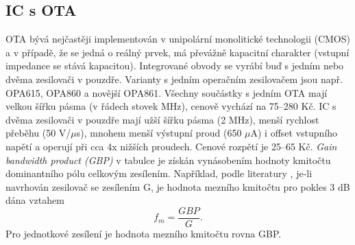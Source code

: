 \subsection{IC s OTA}
OTA bývá nejčastěji implementován v unipolární monolitické technologii (CMOS) a v případě, že se jedná o reálný prvek, má převážně kapacitní charakter (vstupní impedance se stává kapacitou). Integrované obvody se vyrábí buď s jedním nebo dvěma zesilovači v pouzdře. Varianty s jedním operačním zesilovačem jsou např. OPA615, OPA860 a novější OPA861. Všechny součástky s jedním OTA mají velkou šířku pásma (v řádech stovek MHz), cenově vychází na 75--280 Kč. IC s dvěma zesilovači v pouzdře mají užší šířku pásma (2 MHz), menší rychlost přeběhu (50 V/$\mu$s), mnohem menší výstupní proud (650 $\mu$A) i offset vstupního napětí a operují při cca 4x nižších proudech. Cenové rozpětí je 25--65 Kč. \textit{Gain bandwidth product (GBP)} v tabulce je získán vynásobením hodnoty kmitočtu dominantního pólu celkovým zesílením. Například, podle literatury \cite{8}, je-li navrhován zesilovač se zesílením G, je hodnota mezního kmitočtu pro pokles 3 dB dána vztahem
\begin{equation}
f_m = \frac{GBP}{G}.
\end{equation}
\noindent Pro jednotkové zesílení je hodnota mezního kmitočtu rovna GBP.
\renewcommand{\arraystretch}{1.5}
\begin{table}[h]
  \caption[Porovnání integrovaných obvodů s jedním OTA]{\label{tab:Porovnání IC s jedním OTA}Porovnání IC s jedním OTA \cite{13}}
  \end{table}
